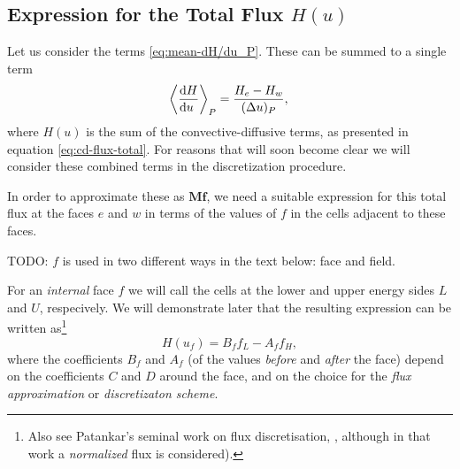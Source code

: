 \documentclass{book}
\newcommand{\MEAN}[1]{\ensuremath{\!\left\langle{{#1}}\right\rangle}}
\newcommand{\bmat}[1]{{\ensuremath{\bm {#1}}}}
\newcommand{\bvec}[1]{{\ensuremath{\bm {#1}}}}
\begin{document}
\subsection{Expression for the Total Flux $H(u)$}

Let us consider the terms \eqref{eq:mean-dH/du_P}. These can be summed to a
single term
\begin{equation}
	\MEAN{\DERIV{H}{u}}_P = \frac{H_e-H_w}{(\Delta u)_P},
\end{equation}
where $H(u)$ is the sum of the convective-diffusive
terms, as presented in equation \eqref{eq:cd-flux-total}. For reasons that will soon
become clear we will consider these combined terms in the discretization procedure.

In order to approximate these as $\bmat{M}\bvec{f}$, we need a suitable
expression for this total flux at the faces $e$ and $w$ in terms of the values
of $f$ in the cells adjacent to these faces.
\begin{framed}
TODO: $f$ is used in two different ways in the text below: face and field.
\end{framed}
For an {\em internal} face $f$ we will call the cells at the lower and upper
energy sides $L$ and $U$, respecively. We will demonstrate later that
the resulting expression can be written as\footnote{Also see Patankar's
seminal work on flux discretisation, \cite[eq. 5.37]{Patankar1980}, although
in that work a {\em normalized} flux is considered).}
\begin{equation}
	H(u_f) = B_ff_L - A_ff_H,
	\label{eq:disc:H(B,A)}
\end{equation}
where the coefficients $B_f$ and $A_f$ (of the values {\em before} and {\em
after} the face) depend on the coefficients $C$ and $D$ around the face, and
on the choice for the {\em flux approximation} or {\em discretizaton scheme}.
\end{document}
